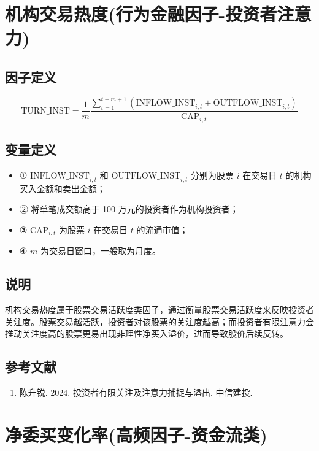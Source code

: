 \documentclass{article}
\begin{document}
\section{机构交易热度(行为金融因子-投资者注意力)}

\subsection{因子定义}
\begin{equation}
    \mathrm{TURN\_INST} = \frac{1}{m}\frac{ \sum_{t=1}^{t-m+1} \left( \mathrm{INFLOW\_INST}_{i,t} + \mathrm{OUTFLOW\_INST}_{i,t} \right)}{\mathrm{CAP}_{i,t}}
\end{equation}

\subsection{变量定义}
\begin{itemize}
    \item ① \(\mathrm{INFLOW\_INST}_{i,t}\) 和 \(\mathrm{OUTFLOW\_INST}_{i,t}\) 分别为股票 \(i\) 在交易日 \(t\) 的机构买入金额和卖出金额；
    \item ② 将单笔成交额高于 100 万元的投资者作为机构投资者；
    \item ③ \(\mathrm{CAP}_{i,t}\) 为股票 \(i\) 在交易日 \(t\) 的流通市值；
    \item ④ \(m\) 为交易日窗口，一般取为月度。
\end{itemize}

\subsection{说明}
机构交易热度属于股票交易活跃度类因子，通过衡量股票交易活跃度来反映投资者关注度。股票交易越活跃，投资者对该股票的关注度越高；而投资者有限注意力会推动关注度高的股票更易出现非理性净买入溢价，进而导致股价后续反转。

\subsection{参考文献}
\begin{enumerate}
    \item 陈升锐. 2024. 投资者有限关注及注意力捕捉与溢出. 中信建投.
\end{enumerate}

\section{净委买变化率(高频因子-资金流类)}
\end{document}
